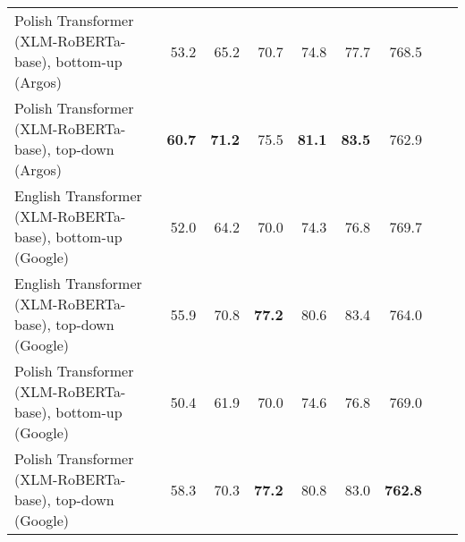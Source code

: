 \begin{table}[ht!]
{\begin{tabular}{lrrrrrrrr}
  Polish Transformer (XLM-RoBERTa-base), bottom-up (Argos) & 53.2 & 65.2 & 70.7 & 74.8 & 77.7 & 768.5 \\ 
  Polish Transformer (XLM-RoBERTa-base), top-down (Argos) & \textbf{60.7} & \textbf{71.2} & 75.5 & \textbf{81.1} & \textbf{83.5} & 762.9 \\ 
  English Transformer (XLM-RoBERTa-base), bottom-up (Google) & 52.0 & 64.2 & 70.0 & 74.3 & 76.8 & 769.7 \\ 
  English Transformer (XLM-RoBERTa-base), top-down (Google) & 55.9 & 70.8 & \textbf{77.2} & 80.6 & 83.4 & 764.0 \\ 
  Polish Transformer (XLM-RoBERTa-base), bottom-up (Google) & 50.4 & 61.9 & 70.0 & 74.6 & 76.8 & 769.0 \\ 
  Polish Transformer (XLM-RoBERTa-base), top-down (Google) & 58.3 & 70.3 & \textbf{77.2} & 80.8 & 83.0 & \textbf{762.8} \\ 
   \hline
\end{tabular}
}
\end{table}





